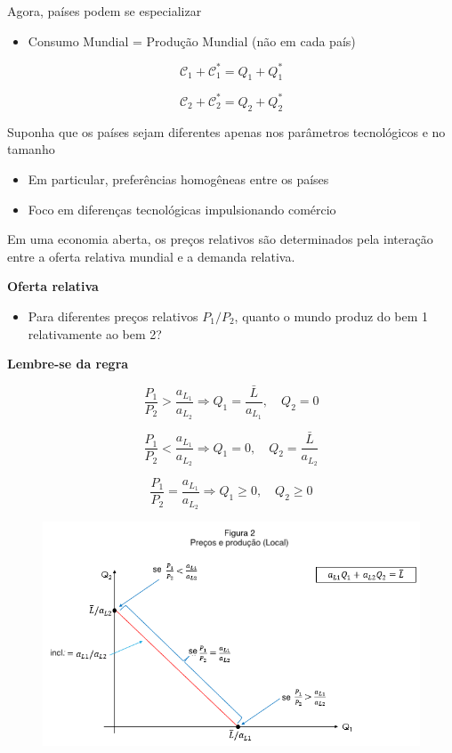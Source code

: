 \documentclass[a4paper,12pt]{article}[abntex2]
\begin{document}
Agora, países podem se especializar \begin{itemize}
    \item Consumo Mundial = Produção Mundial (não em cada país)
\end{itemize}

\[
\mathcal{C}_1 + \mathcal{C}_1^* = Q_1 + Q_1^*
\]

\[
\mathcal{C}_2 + \mathcal{C}_2^* = Q_2 + Q_2^*
\]

Suponha que os países sejam diferentes apenas nos parâmetros tecnológicos e no tamanho \begin{itemize}
    \item Em particular, preferências homogêneas entre os países
    \item Foco em diferenças tecnológicas impulsionando comércio
\end{itemize}

Em uma economia aberta, os preços relativos são determinados pela interação entre a oferta relativa mundial e a demanda relativa.

\textbf{Oferta relativa} \begin{itemize}
    \item Para diferentes preços relativos $P_1/P_2$, quanto o mundo produz do bem 1 relativamente ao bem 2?
\end{itemize}

\textbf{Lembre-se da regra}

\[
\frac{P_1}{P_2} > \frac{a_{L_1}}{a_{L_2}} \Rightarrow Q_1 = \frac{\bar{L}}{a_{L_1}}, \quad Q_2 = 0 \tag{1}
\]

\[
\frac{P_1}{P_2} < \frac{a_{L_1}}{a_{L_2}} \Rightarrow Q_1 = 0, \quad Q_2 = \frac{\bar{L}}{a_{L_2}} \tag{2}
\]

\[
\frac{P_1}{P_2} = \frac{a_{L_1}}{a_{L_2}} \Rightarrow Q_1 \geq 0, \quad Q_2 \geq 0 \tag{3}
\]

\begin{figure}[H]
    \centering
    \includegraphics[width=0.7\linewidth]{Imagens/a8i1.png}
\end{figure}
\end{document}
